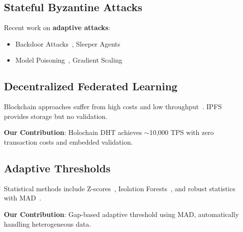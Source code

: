 \subsection{Stateful Byzantine Attacks}

Recent work on \textbf{adaptive attacks}:
\begin{itemize}
    \item Backdoor Attacks~\cite{bagdasaryan2020backdoor}, Sleeper Agents~\cite{chen2020devil}
    \item Model Poisoning~\cite{jagielski2018manipulating}, Gradient Scaling~\cite{bhagoji2019analyzing}
\end{itemize}

\subsection{Decentralized Federated Learning}

Blockchain approaches suffer from high costs and low throughput~\cite{kim2019blockchained, qu2021decentralized, li2020blockchain}. IPFS~\cite{nguyen2021privacy} provides storage but no validation.

\textbf{Our Contribution}: Holochain DHT achieves $\sim$10,000 TPS with zero transaction costs and embedded validation.

\subsection{Adaptive Thresholds}

Statistical methods include Z-scores~\cite{chandola2009anomaly}, Isolation Forests~\cite{liu2008isolation}, and robust statistics with MAD~\cite{rousseeuw1993alternatives, hampel1986robust}.

\textbf{Our Contribution}: Gap-based adaptive threshold using MAD, automatically handling heterogeneous data.

